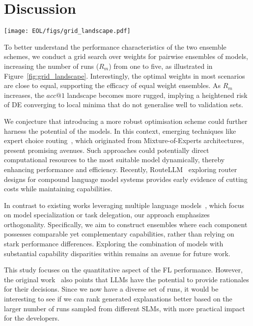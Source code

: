 
\section{Discussion}
\label{sec:discussion}

\begin{figure*}[t]
\centerline{\texttt{[image: EOL/figs/grid\_landscape.pdf]}}
\caption{Landscapes of Pairwise $acc@1$ explored by grid search}
\label{fig:grid_landscape}
\end{figure*}


To better understand the performance characteristics of the two ensemble schemes, we conduct a grid search over weights for pairwise ensembles of models, increasing the number of runs ($R_{m}$) from one to five, as illustrated in Figure~\ref{fig:grid_landscape}. Interestingly, the optimal weights in most scenarios are close to equal, supporting the efficacy of equal weight ensembles. As $R_{m}$ increases, the $acc@1$ landscape becomes more rugged, implying a heightened risk of DE converging to local minima that do not generalise well to validation sets.

We conjecture that introducing a more robust optimisation scheme could further harness the potential of the models. In this context, emerging techniques like expert choice routing~\cite{zhou2022mixture}, which originated from Mixture-of-Experts architectures, present promising avenues. Such approaches could potentially direct computational resources to the most suitable model dynamically, thereby enhancing performance and efficiency. Recently, RouteLLM~\cite{ong2024routellm} exploring router designs for compound language model systems provides early evidence of cutting costs while maintaining capabilities.

In contrast to existing works leveraging multiple language models~\cite{ong2024routellm, shen2024decodecollaboratively}, which focus on model specialization or task delegation, our approach emphasizes orthogonality. Specifically, we aim to construct ensembles where each component possesses comparable yet complementary capabilities, rather than relying on stark performance differences. Exploring the combination of models with substantial capability disparities within \name remains an avenue for future work.


This study focuses on the quantitative aspect of the FL performance. However, the original work~\cite{kangQuantitativeQualitativeEvaluation2024a} also points that LLMs have the potential to provide rationales for their decisions. Since we now have a diverse set of runs, it would be interesting to see if we can rank generated explanations better based on the larger number of runs sampled from different SLMs, with more practical impact for the developers.